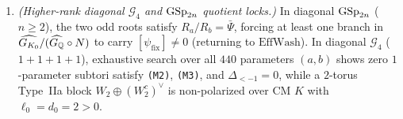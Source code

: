 \begin{theorem}
\begin{enumerate}[label=\textbf{Pillar~\arabic*.}]
\item \emph{(Higher-rank diagonal $\mathcal{G}_4$ and $\mathrm{GSp}_{2n}$ quotient locks.)} In diagonal $\mathrm{GSp}_{2n}$ ($n \ge 2$), the two odd roots satisfy $R_a/R_b = \bar\Psi$, forcing at least one branch in $\widehat{G_{K_0}}/(\widehat{G_{\mathbb{Q}}}\circ N)$ to carry $[\psi_{\mathrm{fix}}] \neq 0$ (returning to $\mathrm{EffWash}$). In diagonal $\mathcal{G}_4$ ($1+1+1+1$), exhaustive search over all $440$ parameters $(a,b)$ shows zero $1$-parameter subtori satisfy \texttt{(M2)}, \texttt{(M3)}, and $\Delta_{<-1}=0$, while a $2$-torus Type~IIa block $W_2 \oplus (W_2^c)^\vee$ is non-polarized over CM $K$ with $\ell_0 = d_0 = 2 > 0$.
\end{enumerate}
\end{theorem}
